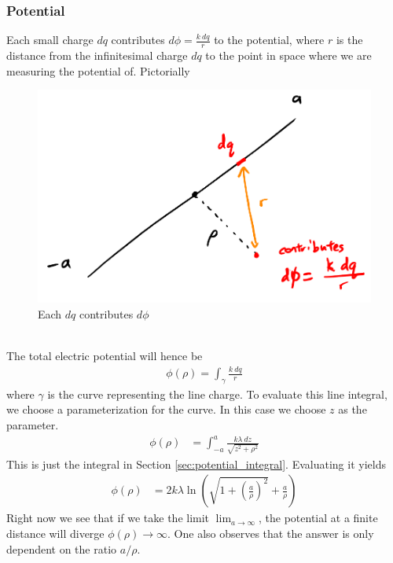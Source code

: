 \documentclass{article}
\begin{document}
\subsubsection{Potential}
Each small charge $dq$ contributes $\displaystyle d\phi = \frac{k\ dq}{r}$ to the potential, where $r$ is the distance from the infinitesimal charge $dq$ to the point in space where we are measuring the potential of. Pictorially
\begin{figure}[h]
    \centering
    \includegraphics[width=0.8\linewidth]{images/finiteline2.png}
    \caption{Each $dq$ contributes $d\phi$}
    \label{fig:finiteline2}
\end{figure}\\[10pt]
The total electric potential will hence be 
\begin{align}
    \phi(\rho)=\int_\gamma \frac{k\ d q}{r}
\end{align}
where $\gamma$ is the curve representing the line charge. To evaluate this line integral, we choose a parameterization for the curve. In this case we choose $z$ as the parameter.
\begin{align}
    \phi(\rho)&=\int_{-a}^a \frac{k \lambda\ d z}{\sqrt{z^2+\rho^2}} 
\end{align}
This is just the integral in Section \ref{sec:potential_integral}. Evaluating it yields 
\begin{align}
    \phi(\rho) &= 2k\lambda \ln \left( \sqrt{1+\left(\frac{a}{\rho}\right)^2} + \frac{a}{\rho}\right)
\end{align}
Right now we see that if we take the limit $\lim_{a\rightarrow\infty}$, the potential at a finite distance will diverge $\phi(\rho) \rightarrow \infty$. One also observes that the answer is only dependent on the ratio $a/\rho$.
\end{document}
